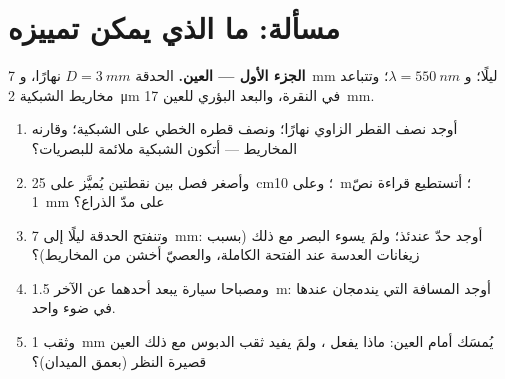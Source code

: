 \section{مسألة: ما الذي يمكن تمييزه}

\begin{problem}
\label{pb:b2:diffraction:1}

\medskip
\noindent\textbf{الجزء الأول --- العين.}
الحدقة $D = \qty{3}{mm}$ نهارًا، و \qty{7}{mm} ليلًا؛ و $\lambda = \qty{550}{nm}$؛ وتتباعد
مخاريط الشبكية \qty{2}{\micro m} في النقرة، والبعد البؤري
للعين \qty{17}{mm}.
\begin{enumerate}
  \item أوجد نصف القطر الزاوي  نهارًا؛ ونصف قطره الخطي على
        الشبكية؛ وقارنه  المخاريط --- أتكون الشبكية
        ملائمة للبصريات؟
  \item وأصغر فصل بين نقطتين يُميَّز على \qty{25}{cm}؛ وعلى
        \qty{10}{m}؛ أتستطيع قراءة نصّ \qty{1}{mm} على مدّ الذراع؟
  \item وتنفتح الحدقة ليلًا إلى \qty{7}{mm}: أوجد حدّ  عندئذ؛
        ولمَ يسوء البصر مع ذلك (بسبب زيغانات
        العدسة عند الفتحة الكاملة، والعصيّ أخشن من المخاريط)؟
  \item ومصباحا سيارة يبعد أحدهما عن الآخر \qty{1.5}{m}: أوجد المسافة التي
        يندمجان عندها في ضوء واحد.
  \item وثقب \qty{1}{mm} يُمسَك أمام العين: ماذا يفعل ،
        ولمَ يفيد ثقب الدبوس مع ذلك العين قصيرة النظر
        (بعمق الميدان)؟
\end{enumerate}


\end{problem}
